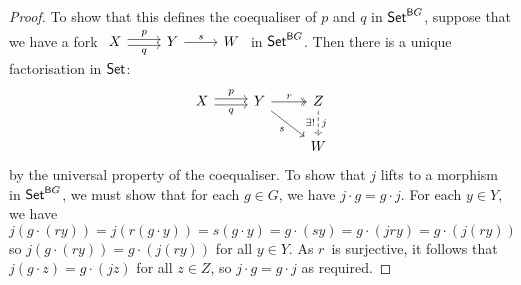 \documentclass[../../solutions]{subfiles}
\begin{document}
\begin{proof}
  To show that this defines the coequaliser of $p$ and $q$ in
  $\mathsf{Set}^{{\mathsf{B}} G}$, suppose that we have a fork 
  $
  \begin{tikzcd}
    X
    \ar[r, shift left=0.5ex, "p"]
    \ar[r, shift right=0.5ex, "q"']
    & Y
    \ar[r, "s"]
    & W
  \end{tikzcd}
  $
  in $\mathsf{Set}^{{\mathsf{B}} G}$.  Then there is a unique factorisation in $\mathsf{Set}$:
  $$
  \begin{tikzcd}
    X
    \ar[r, shift left=0.5ex, "p"]
    \ar[r, shift right=0.5ex, "q"']
    & Y
    \ar[r, twoheadrightarrow, "r"]
    \ar[dr, "s"']
    & Z
    \ar[d, dashed, "\exists!\vphantom{j}"', "j\vphantom{!}"]
    \\
    && W
  \end{tikzcd}
  $$
  by the universal property of the coequaliser.  To show that $j$
  lifts to a morphism in $\mathsf{Set}^{{\mathsf{B}} G}$, we must show that for each
  $g\in G$, we have $j\cdot g=g\cdot j$.  For each $y\in Y$, we have
  $$j(g\cdot(ry)) = j(r(g\cdot y)) = s(g\cdot y) = g\cdot(sy) =
  g\cdot(jry) = g\cdot(j(ry))$$
  so $j(g\cdot(ry))=g\cdot(j(ry))$ for all $y\in Y$.  As $r$~is
  surjective, it follows that $j(g\cdot z)=g\cdot(jz)$ for all $z\in
  Z$, so $j\cdot g=g\cdot j$ as required.
\end{proof}
\end{document}
